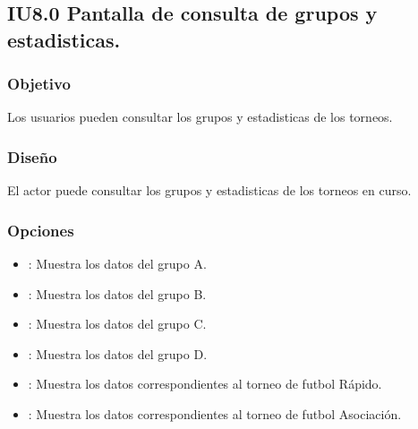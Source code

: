 \subsection{IU8.0 Pantalla de consulta de grupos y estadisticas.}

\subsubsection{Objetivo}
	Los usuarios pueden consultar los grupos y estadisticas de los torneos.

\subsubsection{Diseño}
  El actor puede consultar los grupos y estadisticas de los torneos en curso.


\subsubsection{Opciones}
\begin{itemize}
	\item {}: Muestra los datos del grupo A.
	\item {}: Muestra los datos del grupo B.
	\item {}: Muestra los datos del grupo C.
	\item {}: Muestra los datos del grupo D.
	\item {}: Muestra los datos correspondientes al torneo de futbol Rápido.
	\item {}: Muestra los datos correspondientes al torneo de futbol Asociación.
\end{itemize}
